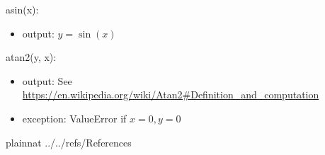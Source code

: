 \documentclass[12pt, titlepage]{article}
\begin{document}
\noindent asin(x):
\begin{itemize}
\item output: $y = \sin(x)$
\end{itemize}

\noindent atan2(y, x):
\begin{itemize}
\item output: See \url{https://en.wikipedia.org/wiki/Atan2#Definition_and_computation}
\item exception: ValueError if $x =0, y =0$
\end{itemize}

\newpage

 {plainnat}
 {../../refs/References}

\end{document}
